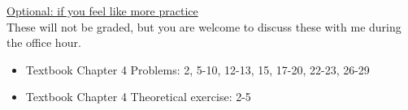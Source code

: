\documentclass[11pt]{article}
\begin{document}
\vspace{12pt}

\underline{Optional: if you feel like more practice}\\
These will not be graded, but you are welcome to discuss these with me during the office hour.

\begin{itemize}


\item Textbook  Chapter 4 Problems: 2, 5-10, 12-13, 15, 17-20, 22-23, 26-29
\item Textbook  Chapter 4 Theoretical exercise: 2-5

\end{itemize}
\end{document}
